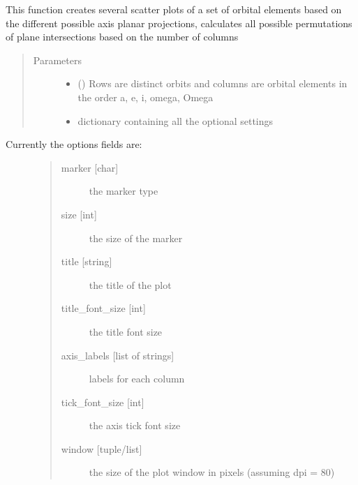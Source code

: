 \documentclass[letterpaper,10pt,english]{sphinxmanual}
\begin{document}
\begin{fulllineitems}
\label{\detokenize{modules/dpt_tools:dpt_tools.orbits}}
This function creates several scatter plots of a set of orbital elements based on the
different possible axis planar projections, calculates all possible permutations of plane
intersections based on the number of columns
\begin{quote}\begin{description}
\item[{Parameters}] \leavevmode\begin{itemize}
\item {} 
 () \textendash{} Rows are distinct orbits and columns are orbital elements in the order a, e, i, omega, Omega

\item {} 
 \textendash{} dictionary containing all the optional settings

\end{itemize}

\end{description}\end{quote}
\begin{description}
\item[{Currently the options fields are:}] \leavevmode\begin{quote}\begin{description}
\item[{marker {[}char{]}}] \leavevmode
the marker type

\item[{size {[}int{]}}] \leavevmode
the size of the marker

\item[{title {[}string{]}}] \leavevmode
the title of the plot

\item[{title\_font\_size {[}int{]}}] \leavevmode
the title font size

\item[{axis\_labels {[}list of strings{]}}] \leavevmode
labels for each column

\item[{tick\_font\_size {[}int{]}}] \leavevmode
the axis tick font size

\item[{window {[}tuple/list{]}}] \leavevmode
the size of the plot window in pixels (assuming dpi = 80)


\end{description}
\end{quote}
\end{description}
\end{fulllineitems}
\end{document}
